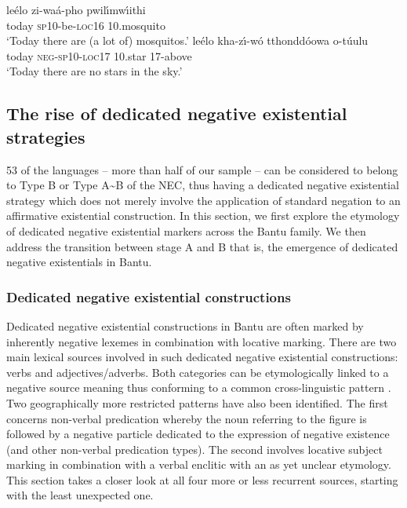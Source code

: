 \documentclass[output=paper,draft,draftmode,colorlinks,citecolor=brown]{langscibook}
\begin{document}
\ea\label{ex:shangaji-mosquito}
\gll le{é}lo zi-waá-pho
pwil{\'\i}mw{\'\i}ithi\\ today \textsc{sp}10-be-\textsc{loc}16
10.mosquito\\
\glt `Today there are (a lot of) mosquitos.'
\ex\label{ex:shangaji-star}
\gll le{é}lo kha-z{\'\i}-w{\'o}
tthondd{\'o}owa o-túulu\\ today \textsc{neg-sp10-loc17} 10.star
17-above\\
\glt `Today there are no stars in the sky.'
\z
\z


\subsection{The rise of dedicated negative existential
strategies}\label{sec:1:5.2} 53 of the languages -- more than half of our
sample -- can be considered to belong to Type B or Type A{\textasciitilde}B
of the NEC, thus having a dedicated negative existential strategy which
does not merely involve the application of standard negation to an
affirmative existential construction. In this section, we first explore the
etymology of dedicated negative existential markers across the Bantu
family. We then address the transition between stage A and B \textemdash that is, the emergence of dedicated negative existentials in Bantu. 

\subsubsection{Dedicated negative existential
constructions}\label{sec:1:5.2.1} Dedicated negative existential
constructions in Bantu are often marked by inherently negative lexemes in
combination with locative marking. There are two main lexical sources
involved in such dedicated negative existential constructions: verbs and
adjectives\slash adverbs. Both categories can be etymologically linked to a
negative source meaning thus conforming to a common cross-linguistic pattern
\citep{Veselinova2013}. Two geographically more restricted patterns have
also been identified. The first concerns non-verbal predication whereby
the noun referring to the figure is followed by a negative particle
dedicated to the expression of negative existence (and other non-verbal
predication types). The second involves locative subject marking in
combination with a verbal enclitic with an as yet unclear etymology. This
section takes a closer look at all four more or less recurrent sources, starting with the least
unexpected one.
\end{document}
